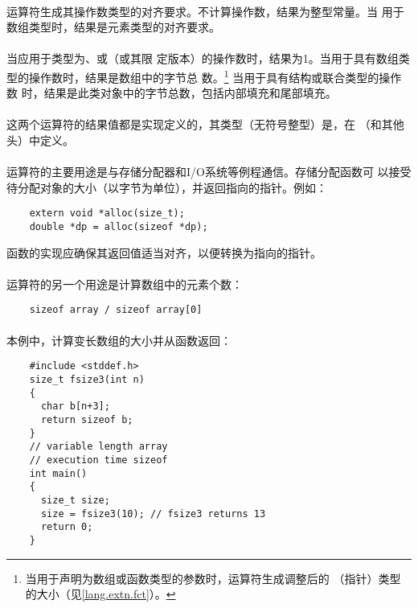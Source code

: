 {\paragraph{}
运算符生成其操作数类型的对齐要求。不计算操作数，结果为整型常量。当
用于数组类型时，结果是元素类型的对齐要求。

\paragraph{}
当应用于类型为、或（或其限
定版本）的操作数时，结果为1。当用于具有数组类型的操作数时，结果是数组中的字节总
数。\footnote{当用于声明为数组或函数类型的参数时，运算符生成调整后的
（指针）类型的大小（见\ref{lang.extn.fct}）。} 当用于具有结构或联合类型的操作数
时，结果是此类对象中的字节总数，包括内部填充和尾部填充。

\paragraph{}
这两个运算符的结果值都是实现定义的，其类型（无符号整型）是，在
（和其他头）中定义。

\paragraph{}
\ex {}运算符的主要用途是与存储分配器和I/O系统等例程通信。存储分配函数可
以接受待分配对象的大小（以字节为单位），并返回指向的指针。例如：
\begin{lstlisting}
    extern void *alloc(size_t);
    double *dp = alloc(sizeof *dp);
\end{lstlisting}
函数的实现应确保其返回值适当对齐，以便转换为指向的指针。

\paragraph{}
\ex {}运算符的另一个用途是计算数组中的元素个数：
\begin{lstlisting}
    sizeof array / sizeof array[0]
\end{lstlisting}

\paragraph{}
\ex 本例中，计算变长数组的大小并从函数返回：
\begin{lstlisting}
    #include <stddef.h>
    size_t fsize3(int n)
    {
      char b[n+3];
      return sizeof b;
    }
    // variable length array
    // execution time sizeof
    int main()
    {
      size_t size;
      size = fsize3(10); // fsize3 returns 13
      return 0;
    }
\end{lstlisting}

}
